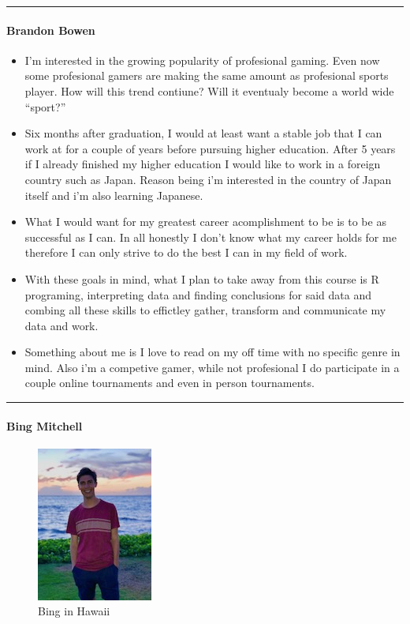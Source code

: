 \documentclass[]{article}
\let\oldparagraph\paragraph
\renewcommand{\paragraph}[1]{\oldparagraph{#1}\mbox{}}
\begin{document}
\begin{center}\rule{0.5\linewidth}{\linethickness}\end{center}

\paragraph{Brandon Bowen}\label{brandon-bowen}

\begin{itemize}
\item
  I'm interested in the growing popularity of profesional gaming. Even
  now some profesional gamers are making the same amount as profesional
  sports player. How will this trend contiune? Will it eventualy become
  a world wide ``sport?''
\item
  Six months after graduation, I would at least want a stable job that I
  can work at for a couple of years before pursuing higher education.
  After 5 years if I already finished my higher education I would like
  to work in a foreign country such as Japan. Reason being i'm
  interested in the country of Japan itself and i'm also learning
  Japanese.
\item
  What I would want for my greatest career acomplishment to be is to be
  as successful as I can. In all honestly I don't know what my career
  holds for me therefore I can only strive to do the best I can in my
  field of work.
\item
  With these goals in mind, what I plan to take away from this course is
  R programing, interpreting data and finding conclusions for said data
  and combing all these skills to effictley gather, transform and
  communicate my data and work.
\item
  Something about me is I love to read on my off time with no specific
  genre in mind. Also i'm a competive gamer, while not profesional I do
  participate in a couple online tournaments and even in person
  tournaments.
\end{itemize}

\begin{center}\rule{0.5\linewidth}{\linethickness}\end{center}

\paragraph{Bing Mitchell}\label{bing-mitchell}

\begin{figure}
\centering
\includegraphics{PicOfBing.jpg}
\caption{Bing in Hawaii}
\end{figure}
\end{document}
